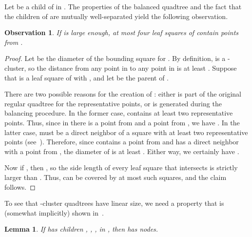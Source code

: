 \documentclass[11pt]{paper}
\newtheorem {lem}[theorem] {Lemma}
\newtheorem {observation}[theorem] {Observation}
\begin{document}
     
    Let  be a child of  in .
    The properties of the balanced quadtree  and the
    fact that the children of  are mutually well-separated yield 
    the following observation.
    
      \begin {observation} \label {obs:close}
        If  is large enough,
        at most four leaf squares of  contain points from .
      \end {observation}
      
      \begin {proof}
        Let  be the diameter of the bounding square for 
	. By definition,  is a -cluster,
        so the distance from any point in  to any point
        in  is at least .
	Suppose that  is a leaf square of  with
	, and let  be the parent of .

	There are two possible reasons for the creation of :
	either  is part of the original regular quadtree for
	the representative points, or  is generated during the
	balancing procedure.
	 In the former case, 
	 contains at least two representative points.  
	Thus, since in  there is a point from  and 
	a point from ,
	we have . In the latter case, 
	 must be a direct neighbor of a square with
	at least two representative points 
	(see~\cite[Proof of Theorem~14.4]{deBergChvKrOv08}).
	Therefore, since   contains
	a point from  and has a direct neighbor with a point
	from , the diameter of  is at least
	. Either way, we certainly have 
	.

        Now if , then , so the side length
	of every leaf square  that intersects  is strictly larger than
	. Thus,  can be covered by at most  such squares,
	and the claim follows. 
      \end{proof}

      To see that -cluster quadtrees have linear size, we need 
      a property that is (somewhat implicitly)
      shown in~\cite[Section~4.3]{KrznaricLe98}.

      \begin{lem}\label{lem:c-cluster-QT}
      If  has  children , , ,  in , 
      then  has  nodes.
      \end{lem}
\end{document}
